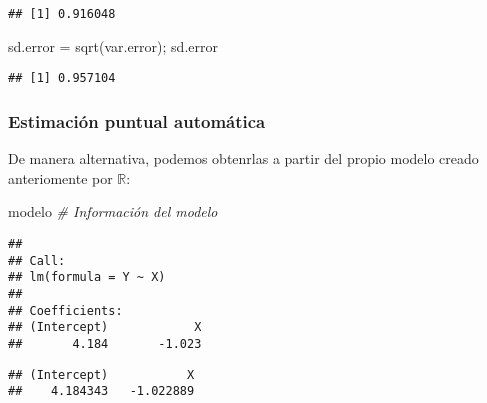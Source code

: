 \documentclass[
]{article}
\newenvironment{Shaded}{\begin{snugshade}}{\end{snugshade}}
\newcommand{\CommentTok}[1]{\textcolor[rgb]{0.56,0.35,0.01}{\textit{#1}}}
\newcommand{\DecValTok}[1]{\textcolor[rgb]{0.00,0.00,0.81}{#1}}
\newcommand{\FunctionTok}[1]{\textcolor[rgb]{0.00,0.00,0.00}{#1}}
\newcommand{\NormalTok}[1]{#1}
\newcommand{\OtherTok}[1]{\textcolor[rgb]{0.56,0.35,0.01}{#1}}
\newcommand{\SpecialCharTok}[1]{\textcolor[rgb]{0.00,0.00,0.00}{#1}}
\begin{document}
\begin{verbatim}
## [1] 0.916048
\end{verbatim}

\begin{Shaded}
\begin{Highlighting}[]
\NormalTok{sd.error }\OtherTok{=} \FunctionTok{sqrt}\NormalTok{(var.error); sd.error}
\end{Highlighting}
\end{Shaded}

\begin{verbatim}
## [1] 0.957104
\end{verbatim}

\hypertarget{estimaciuxf3n-puntual-automuxe1tica}{%
\subsubsection{Estimación puntual
automática}\label{estimaciuxf3n-puntual-automuxe1tica}}

De manera alternativa, podemos obtenrlas a partir del propio modelo
creado anteriomente por \(\mathbb{R}\):

\begin{Shaded}
\begin{Highlighting}[]
\NormalTok{modelo    }\CommentTok{\# Información del modelo}
\end{Highlighting}
\end{Shaded}

\begin{verbatim}
## 
## Call:
## lm(formula = Y ~ X)
## 
## Coefficients:
## (Intercept)            X  
##       4.184       -1.023
\end{verbatim}

\begin{Shaded}
\end{Shaded}

\begin{verbatim}
## (Intercept)           X 
##    4.184343   -1.022889
\end{verbatim}

\begin{Shaded}
\end{Shaded}
\end{document}
